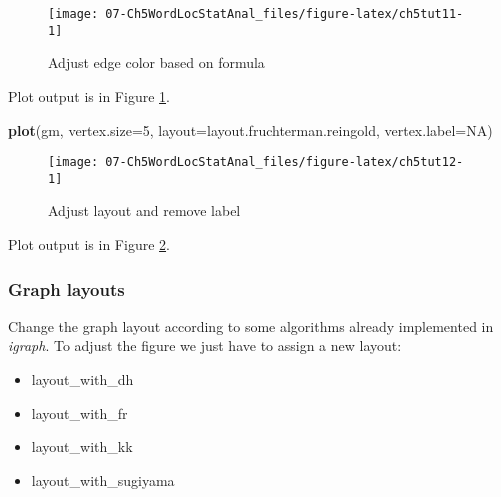 \documentclass[
]{article}
\newenvironment{Shaded}{\begin{snugshade}}{\end{snugshade}}
\newcommand{\AttributeTok}[1]{\textcolor[rgb]{0.13,0.29,0.53}{#1}}
\newcommand{\ConstantTok}[1]{\textcolor[rgb]{0.56,0.35,0.01}{#1}}
\newcommand{\DecValTok}[1]{\textcolor[rgb]{0.00,0.00,0.81}{#1}}
\newcommand{\FloatTok}[1]{\textcolor[rgb]{0.00,0.00,0.81}{#1}}
\newcommand{\FunctionTok}[1]{\textcolor[rgb]{0.13,0.29,0.53}{\textbf{#1}}}
\newcommand{\NormalTok}[1]{#1}
\newcommand{\OtherTok}[1]{\textcolor[rgb]{0.56,0.35,0.01}{#1}}
\newcommand{\SpecialCharTok}[1]{\textcolor[rgb]{0.81,0.36,0.00}{\textbf{#1}}}
\newcommand{\StringTok}[1]{\textcolor[rgb]{0.31,0.60,0.02}{#1}}
\providecommand{\tightlist}{%
  \setlength{\itemsep}{0pt}\setlength{\parskip}{0pt}}
\begin{document}
\begin{figure}

{\centering \texttt{[image: 07-Ch5WordLocStatAnal\_files/figure-latex/ch5tut11-1]} 

}

\caption{Adjust edge color based on formula}\label{fig:ch5tut11}
\end{figure}

Plot output is in Figure \ref{fig:ch5tut11}.

\begin{Shaded}
\begin{Highlighting}[]
\FunctionTok{plot}\NormalTok{(gm, }\AttributeTok{vertex.size=}\DecValTok{5}\NormalTok{,}
     \AttributeTok{layout=}\NormalTok{layout.fruchterman.reingold,}
     \AttributeTok{vertex.label=}\ConstantTok{NA}\NormalTok{)}
\end{Highlighting}
\end{Shaded}

\begin{figure}

{\centering \texttt{[image: 07-Ch5WordLocStatAnal\_files/figure-latex/ch5tut12-1]} 

}

\caption{Adjust layout and remove label}\label{fig:ch5tut12}
\end{figure}

Plot output is in Figure \ref{fig:ch5tut12}.

\hypertarget{graph-layouts}{%
\subsubsection{Graph layouts}\label{graph-layouts}}

Change the graph layout according to some algorithms already implemented in \emph{igraph}. To adjust the figure we just have to assign a new layout:

\begin{itemize}
\tightlist
\item
  layout\_with\_dh
\item
  layout\_with\_fr
\item
  layout\_with\_kk
\item
  layout\_with\_sugiyama
\end{itemize}

\begin{Shaded}
\end{Shaded}
\end{document}
